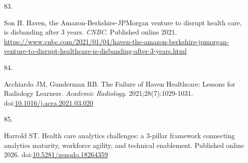 \documentclass[
  american,
  11pt,
  letterpaper,
  oneside  ,captions=tableheading
]{scrartcl}
\newlength{\cslhangindent}
\newlength{\csllabelwidth}
\newenvironment{CSLReferences}[2] %
 {\begin{list}{}{%
  \setlength{\itemindent}{0pt}
  \setlength{\leftmargin}{0pt}
  \setlength{\parsep}{0pt}
  \ifodd #1
   \setlength{\leftmargin}{\cslhangindent}
   \setlength{\itemindent}{-1\cslhangindent}
  \fi
  \setlength{\itemsep}{#2\baselineskip}}}
 {\end{list}}
\newcommand{\CSLLeftMargin}[1]{\parbox[t]{\csllabelwidth}{\strut#1\strut}}
\newcommand{\CSLRightInline}[1]{\parbox[t]{\linewidth - \csllabelwidth}{\strut#1\strut}}
\begin{document}
\begin{CSLReferences}{0}{1}
\CSLLeftMargin{83. }%
\CSLRightInline{Son H. {Haven, the Amazon-Berkshire-JPMorgan venture to
disrupt health care, is disbanding after 3 years}. \emph{{CNBC}}.
Published online 2021.
\url{https://www.cnbc.com/2021/01/04/haven-the-amazon-berkshire-jpmorgan-venture-to-disrupt-healthcare-is-disbanding-after-3-years.html}}

\CSLLeftMargin{84. }%
\CSLRightInline{Acchiardo JM, Gunderman RB. {The Failure of Haven
Healthcare: Lessons for Radiology Learners}. \emph{Academic Radiology}.
2021;28(7):1029-1031.
doi:\href{https://doi.org/10.1016/j.acra.2021.03.020}{10.1016/j.acra.2021.03.020}}

\CSLLeftMargin{85. }%
\CSLRightInline{Harrold ST. {Health care analytics challenges: a
3-pillar framework connecting analytics maturity, workforce agility, and
technical enablement}. Published online 2026.
doi:\href{https://doi.org/10.5281/zenodo.18264359}{10.5281/zenodo.18264359}}

\end{CSLReferences}
\end{document}
